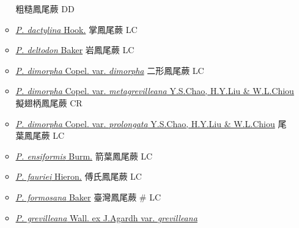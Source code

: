 \begin{itemize}
\begin{itemize}
                                        粗糙鳳尾蕨   DD
        \item[] \href{http://www.theplantlist.org/tpl1.1/search?q=Pteris+dactylina}{\textit{P. dactylina} Hook.}   掌鳳尾蕨   LC
        \item[] \href{http://www.theplantlist.org/tpl1.1/search?q=Pteris+deltodon}{\textit{P. deltodon} Baker}   岩鳳尾蕨   LC
        \item[] \href{http://www.theplantlist.org/tpl1.1/search?q=Pteris+dimorpha+var.+dimorpha}{\textit{P. dimorpha} Copel. var. \textit{dimorpha}}  
                                        二形鳳尾蕨   LC
        \item[] \href{http://www.theplantlist.org/tpl1.1/search?q=Pteris+dimorpha+var.+metagrevilleana}{\textit{P. dimorpha} Copel. var. \textit{metagrevilleana} Y.S.Chao, H.Y.Liu \& W.L.Chiou}  
                                        擬翅柄鳳尾蕨   CR
        \item[] \href{http://www.theplantlist.org/tpl1.1/search?q=Pteris+dimorpha+var.+prolongata}{\textit{P. dimorpha} Copel. var. \textit{prolongata} Y.S.Chao, H.Y.Liu \& W.L.Chiou}  
                                        尾葉鳳尾蕨   LC
        \item[] \href{http://www.theplantlist.org/tpl1.1/search?q=Pteris+ensiformis}{\textit{P. ensiformis} Burm.}   箭葉鳳尾蕨   LC
        \item[] \href{http://www.theplantlist.org/tpl1.1/search?q=Pteris+fauriei}{\textit{P. fauriei} Hieron.}   傅氏鳳尾蕨   LC
        \item[] \href{http://www.theplantlist.org/tpl1.1/search?q=Pteris+formosana}{\textit{P. formosana} Baker}   臺灣鳳尾蕨  \# LC
        \item[] \href{http://www.theplantlist.org/tpl1.1/search?q=Pteris+grevilleana+var.+grevilleana}{\textit{P. grevilleana} Wall. ex J.Agardh var. \textit{grevilleana}}  

\end{itemize}
\end{itemize}

